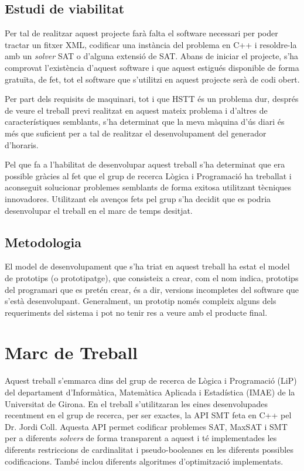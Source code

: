 \documentclass[11pt,a4paper,oneside]{article}
\begin{document}
  \subsection{Estudi de viabilitat}
  Per tal de realitzar aquest projecte farà falta el software necessari per poder tractar un fitxer XML, codificar una instància del problema en C++ i resoldre-la amb un \textit{solver} SAT o d'alguna extensió de SAT. 
  Abans de iniciar el projecte, s'ha comprovat l'existència d'aquest software i que aquest estigués disponible de forma gratuïta, de fet, tot el software que s'utilitzi en aquest projecte serà de codi obert.

  Per part dels requisits de maquinari, tot i que HSTT és un problema dur, 
  després de veure el treball previ realitzat en aquest mateix problema i d'altres de característiques semblants, s'ha determinat que la meva màquina d'ús diari és més que suficient per a tal de realitzar el desenvolupament del generador d'horaris.

  Pel que fa a l'habilitat de desenvolupar aquest treball s'ha determinat que era possible gràcies al fet que
  el grup de recerca Lògica i Programació ha treballat i aconseguit solucionar problemes semblants de forma exitosa utilitzant tècniques innovadores. 
  Utilitzant els avenços fets pel grup s'ha decidit que es podria desenvolupar el treball en el marc de temps desitjat.

  \subsection{Metodologia}

  El model de desenvolupament que s'ha triat en aquest treball ha estat el model de prototips (o prototipatge), 
  que consisteix a crear, com el nom indica, prototips del programari que es pretén crear, és a dir, versions incompletes del software que s'està desenvolupant.
  Generalment, un prototip només compleix alguns dels requeriments del sistema i pot no tenir res a veure amb el producte final.
  
  \section{Marc de Treball}
   Aquest treball s'emmarca dins del grup de recerca de Lògica i Programació (LiP) del departament d'Informàtica, Matemàtica Aplicada i Estadística (IMAE) de la Universitat de Girona. 
    En el treball s'utilitzaran les eines desenvolupades recentment en el grup de recerca, per ser exactes, la API SMT feta en C++ pel Dr. Jordi Coll. 
    Aquesta API permet codificar problemes SAT, MaxSAT i SMT per a diferents \textit{solvers} de forma transparent a aquest i té implementades les diferents restriccions de cardinalitat i pseudo-booleanes en les diferents possibles codificacions. 
    També inclou diferents algoritmes d'optimització implementats.
\end{document}
